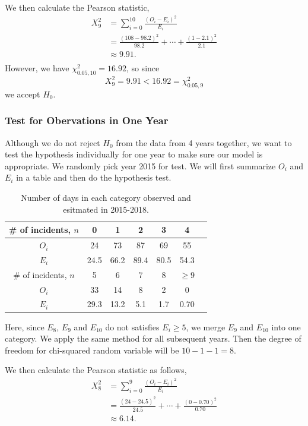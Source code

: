 \documentclass[11pt,a4paper,english]{article}
\begin{document}
We then calculate the Pearson statistic,
\[
	\begin{aligned}
		X_{9}^{2} &= \sum_{i = 0}^{10}\frac{(O_{i}-E_{i})^{2}}{E_{i}}\\
		&= \frac{(108-98.2)^{2}}{98.2}+\cdots+\frac{(1-2.1)^{2}}{2.1}\\
		&\approx 9.91.\\
	\end{aligned}
\] 
However, we have $\chi^{2}_{0.05,10} = 16.92$, so since 
\[X_{9}^{2} = 9.91 < 16.92 = \chi_{0.05,9}^{2}\]
we accept $H_{0}$.
\subsubsection{Test for Obervations in One Year}
Although we do not reject $H_{0}$ from the data from 4 years together, we want to test the hypothesis individually for one year to make sure our model is appropriate. We randomly pick year 2015 for test. We will first summarize $O_{i}$ and $E_{i}$ in a table and then do the hypothesis test.


\begin{table}[htbp]
    \centering
    \caption{Number of days in each category observed and esitmated in 2015-2018.}
	\begin{tabular}{c|cccccc}
		\hline
        \# of incidents, $n$ & 0 & 1 & 2 & 3 & 4  \\
		\hline
		$O_{i}$ & 24 & 73 & 87 & 69 & 55 \\
		\hline
		$E_{i}$ & 24.5 & 66.2 & 89.4 & 80.5 & 54.3 \\ 
		\hline
		\hline
		\# of incidents, $n$ & 5 & 6 & 7 & 8 & $\geq 9$  \\
		\hline
		$O_{i}$ & 33 & 14 & 8 & 2 & 0\\
		\hline
		$E_{i}$ & 29.3 & 13.2 & 5.1 & 1.7 & 0.70\\ 
		\hline 
    \end{tabular}
\end{table}

Here, since $E_{8}$, $E_{9}$ and $E_{10}$ do not satisfies $E_{i} \geq 5$, we merge $E_{9}$ and $E_{10}$ into one category. 
We apply the same method for all subsequent years. Then the degree of freedom for chi-squared random variable will be $10-1-1 = 8$.

We then calculate the Pearson statistic as follows,
\[
	\begin{aligned}
		X_{8}^{2} &= \sum_{i = 0}^{9}\frac{(O_{i}-E_{i})^{2}}{E_{i}}\\
		&= \frac{(24-24.5)^{2}}{24.5}+\cdots+\frac{(0-0.70)^{2}}{0.70}\\
		&\approx 6.14.\\
	\end{aligned}
\] 
\end{document}
